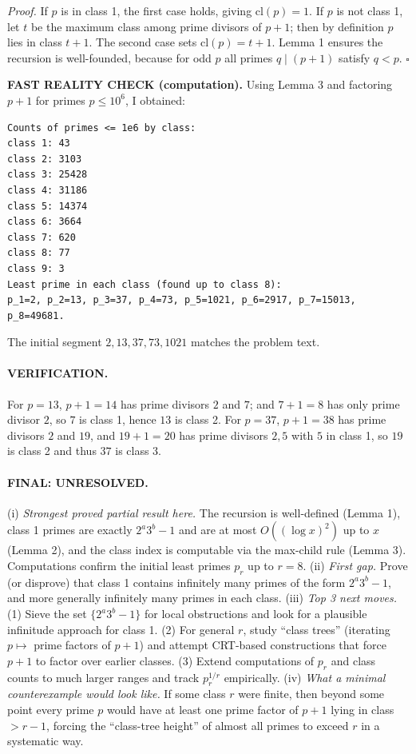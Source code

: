 \emph{Proof.}
If $p$ is in class 1, the first case holds, giving $\mathrm{cl}(p)=1$.
If $p$ is not class 1, let $t$ be the maximum class among prime divisors of $p+1$; then by definition $p$ lies in class $t+1$.
The second case sets $\mathrm{cl}(p)=t+1$.
Lemma 1 ensures the recursion is well-founded, because for odd $p$ all primes $q\mid(p+1)$ satisfy $q<p$.
\hfill$\square$

\textbf{FAST REALITY CHECK (computation).}
Using Lemma 3 and factoring $p+1$ for primes $p\le 10^6$, I obtained:
\begin{verbatim}
Counts of primes <= 1e6 by class:
class 1: 43
class 2: 3103
class 3: 25428
class 4: 31186
class 5: 14374
class 6: 3664
class 7: 620
class 8: 77
class 9: 3
Least prime in each class (found up to class 8):
p_1=2, p_2=13, p_3=37, p_4=73, p_5=1021, p_6=2917, p_7=15013, p_8=49681.
\end{verbatim}
The initial segment $2,13,37,73,1021$ matches the problem text.

\paragraph{VERIFICATION.}
For $p=13$, $p+1=14$ has prime divisors $2$ and $7$; and $7+1=8$ has only prime divisor $2$, so $7$ is class 1, hence $13$ is class 2.
For $p=37$, $p+1=38$ has prime divisors $2$ and $19$, and $19+1=20$ has prime divisors $2,5$ with $5$ in class 1, so $19$ is class 2 and thus $37$ is class 3.

\paragraph{FINAL: UNRESOLVED.}
(i) \emph{Strongest proved partial result here.} The recursion is well-defined (Lemma 1), class 1 primes are exactly $2^a3^b-1$ and are at most $O((\log x)^2)$ up to $x$ (Lemma 2), and the class index is computable via the max-child rule (Lemma 3). Computations confirm the initial least primes $p_r$ up to $r=8$.
(ii) \emph{First gap.} Prove (or disprove) that class 1 contains infinitely many primes of the form $2^a3^b-1$, and more generally infinitely many primes in each class.
(iii) \emph{Top 3 next moves.} (1) Sieve the set $\{2^a3^b-1\}$ for local obstructions and look for a plausible infinitude approach for class 1. (2) For general $r$, study “class trees” (iterating $p\mapsto$ prime factors of $p+1$) and attempt CRT-based constructions that force $p+1$ to factor over earlier classes. (3) Extend computations of $p_r$ and class counts to much larger ranges and track $p_r^{1/r}$ empirically.
(iv) \emph{What a minimal counterexample would look like.} If some class $r$ were finite, then beyond some point every prime $p$ would have at least one prime factor of $p+1$ lying in class $>r-1$, forcing the “class-tree height” of almost all primes to exceed $r$ in a systematic way.



